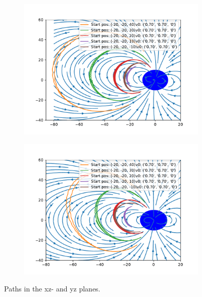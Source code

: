 \documentclass{article}
\begin{document}
\begin{figure}[h]
    \begin{subfigure}{0.5\textwidth}
        \includegraphics[width=\linewidth]{./media/xz-plane.pdf}
    \end{subfigure}
    \begin{subfigure}{0.5\textwidth}
        \includegraphics[width=\linewidth]{./media/yz-plane.pdf}
    \end{subfigure}
    \caption{Paths in the xz- and yz planes.}
    \label{paths}
\end{figure}
\end{document}
